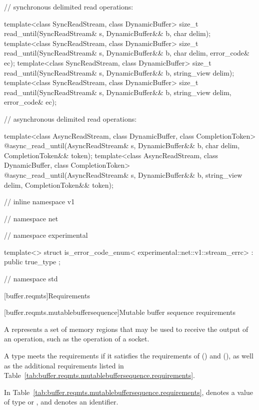 \begin{codeblock}
{{{{  // synchronous delimited read operations:

  template<class SyncReadStream, class DynamicBuffer>
    size_t read_until(SyncReadStream& s, DynamicBuffer&& b, char delim);
  template<class SyncReadStream, class DynamicBuffer>
    size_t read_until(SyncReadStream& s, DynamicBuffer&& b,
                      char delim, error_code& ec);
  template<class SyncReadStream, class DynamicBuffer>
    size_t read_until(SyncReadStream& s, DynamicBuffer&& b, string_view delim);
  template<class SyncReadStream, class DynamicBuffer>
    size_t read_until(SyncReadStream& s, DynamicBuffer&& b,
                      string_view delim, error_code& ec);

  // asynchronous delimited read operations:

  template<class AsyncReadStream, class DynamicBuffer, class CompletionToken>
    @\DEDUCED@ async_read_until(AsyncReadStream& s,
                             DynamicBuffer&& b, char delim,
                             CompletionToken&& token);
  template<class AsyncReadStream, class DynamicBuffer, class CompletionToken>
    @\DEDUCED@ async_read_until(AsyncReadStream& s,
                             DynamicBuffer&& b, string_view delim,
                             CompletionToken&& token);

} // inline namespace v1
} // namespace net
} // namespace experimental

  template<> struct is_error_code_enum<
    experimental::net::v1::stream_errc>
      : public true_type {};

} // namespace std
\end{codeblock}



[buffer.reqmts]{Requirements}


[buffer.reqmts.mutablebuffersequence]{Mutable buffer sequence requirements}

\pnum
A  represents a set of memory regions that may be used to receive the output of an operation, such as the  operation of a socket.

\pnum
A type  meets the  requirements if it satisfies the requirements of  () and  (), as well as the additional requirements listed in Table~\ref{tab:buffer.reqmts.mutablebuffersequence.requirements}.

\pnum
In Table~\ref{tab:buffer.reqmts.mutablebuffersequence.requirements},
 denotes a value of type  or ,
and  denotes an identifier.

